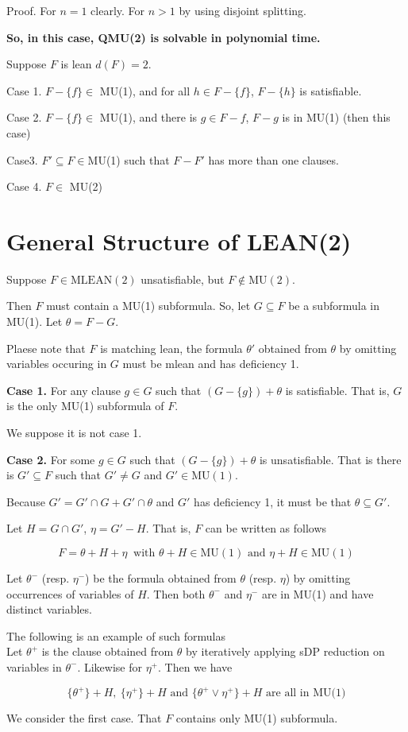 \documentclass[12pt]{article}
\begin{document}
\begin{CJK*}{GBK}{song}
Proof. For $n=1$ clearly. For $n>1$ by using disjoint splitting. 


{\bf So, in this case, QMU(2) is solvable in polynomial time.}


Suppose $F$ is lean $d(F)=2$. 

Case 1. $F-\{f\}\in$ MU(1), and for all $h\in F-\{f\}$, $F-\{h\}$ is satisfiable.

Case 2. $F-\{f\}\in$ MU(1), and there is $g\in F-f$, $F-g$ is in MU(1) (then this case)

Case3. $F'\subseteq F\in $MU(1) such that $F-F'$ has more than one clauses. 

Case 4. $F\in$ MU(2)



\section{General Structure of LEAN(2)}

Suppose $F\in\text{MLEAN}(2)$ unsatisfiable, but $F\not\in \text{MU}(2)$. 

Then $F$ must contain a MU(1) subformula. So, let $G\subseteq F$ be a subformula in MU(1). Let $\theta=F-G$. 

Plaese note that $F$ is matching lean, the formula $\theta'$ obtained from $\theta$ by omitting variables occuring in $G$ must be mlean and has deficiency 1.  

{\bf Case 1.} For any clause $g\in G$  such that $(G-\{g\})+\theta$ is satisfiable. That is, $G$ is the only MU(1) subformula of $F$. 

We suppose it is not case 1. 

   
{\bf Case 2.} For some $g\in G$ such that $(G-\{g\})+\theta$ is unsatisfiable.
That is there is $G'\subseteq F$ such that $G'\not=G$ and $G'\in \text{MU}(1)$. 

Because $G'=G'\cap G+G'\cap \theta$ and $G'$ has deficiency 1, it must be that $\theta\subseteq G'$. 

Let $H=G\cap G'$, $\eta =G'-H$. That is, $F$ can be written as follows

$$F=\theta+H+\eta\ \text{ with }\theta+H\in \text{MU}(1) \text{ and } \eta+H \in \text{MU}(1)$$ 

Let $\theta^-$ (resp. $\eta^-$) be the formula obtained from $\theta$ (resp. $\eta$) by omitting occurrences of variables of $H$. Then both $\theta^-$ and $\eta^-$ are in MU(1) and have distinct variables. 

The following is an example of such formulas \\


Let $\theta^+$ is the clause obtained from $\theta$ by iteratively applying sDP reduction on variables in $\theta^-$. Likewise for $\eta^+$. Then we have 

$$\{\theta^+\}+H,\ \{\eta^+\}+H \text{ and } \{\theta^+\vee \eta^+\}+H \text{ are all in MU(1)}$$ 


We consider the first case. That $F$ contains only MU(1) subformula.



\end{CJK*}
\end{document}
